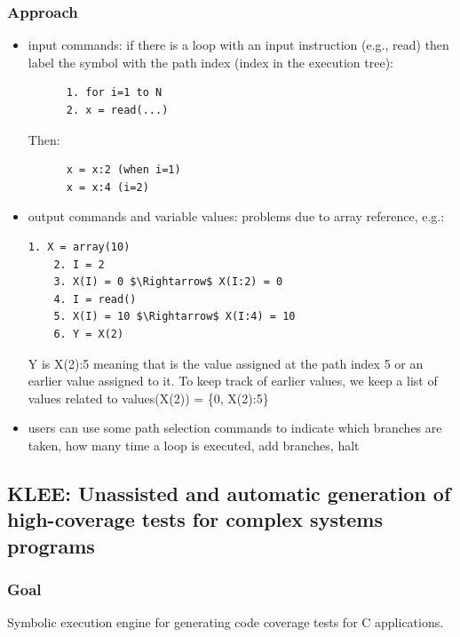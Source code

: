 \documentclass[10pt, a4paper]{article}
\begin{document}
  \subsubsection{Approach}

    \begin{itemize}
      \item input commands: if there is a loop with an input instruction (e.g., read) then label the symbol with the path index (index in the execution tree):

        \begin{lstlisting}
      1. for i=1 to N 
      2. x = read(...)
        \end{lstlisting}
      Then:
      \begin{lstlisting}
      x = x:2 (when i=1)
      x = x:4 (i=2)
        \end{lstlisting}

        \item output commands and variable values: problems due to array reference, e.g.:
      \begin{lstlisting}[mathescape=true]
    1. X = array(10)
    2. I = 2
    3. X(I) = 0 $\Rightarrow$ X(I:2) = 0
    4. I = read()
    5. X(I) = 10 $\Rightarrow$ X(I:4) = 10
    6. Y = X(2)
      \end{lstlisting}
      Y is X(2):5 meaning that is the value assigned at the path index 5 or an earlier value assigned to it. To keep track of earlier values, we keep a list of values related to values(X(2)) = \{0, X(2):5\}

      \item users can use some path selection commands to indicate which branches are taken, how many time a loop is executed, add branches, halt

    \end{itemize}

\subsection{\cite{KLEE-OSDI08} KLEE: Unassisted and automatic generation of high-coverage tests for complex systems programs} 

\subsubsection{Goal}

Symbolic execution engine for generating code coverage tests for C applications.
\end{document}
